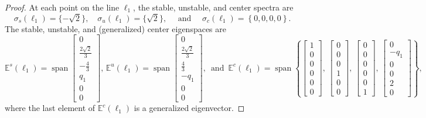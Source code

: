 \documentclass[11pt]{article}
\numberwithin{equation}{section}
\begin{document}
\begin{proof}
At each point on the line $\ell_1$,
the stable, unstable, and center spectra are 
%
\[ \sigma_s(\ell_1) = \{ -\sqrt 2 \}, \quad \sigma_u(\ell_1) = \{ \sqrt 2 \}, \quad \text{ and } \quad \sigma_c(\ell_1) = \left\{ 0,0,0,0 \right\}. \]
%
The stable, unstable, and (generalized) center eigenspaces are 
%
\[
\mathbb E^s(\ell_1) = \operatorname{span} \begin{bmatrix} 0 \\ \tfrac{2\sqrt 2}{3} \\ -\tfrac{4}{3} \\ q_1 \\ 0 \\ 0 \end{bmatrix}, \,
\mathbb E^u(\ell_1) = \operatorname{span} \begin{bmatrix} 0 \\ \tfrac{2\sqrt 2}{3} \\ \tfrac{4}{3} \\ -q_1 \\ 0 \\ 0 \end{bmatrix}, \, \text{ and } \,
\mathbb E^c(\ell_1) = \operatorname{span} \left\{ 
\begin{bmatrix} 1 \\ 0 \\ 0 \\ 0 \\ 0 \\ 0 \end{bmatrix}, \,
\begin{bmatrix} 0 \\ 0 \\ 0 \\ 1 \\ 0 \\ 0 \end{bmatrix}, \, 
\begin{bmatrix} 0 \\ 0 \\ 0 \\ 0 \\ 0 \\ 1 \end{bmatrix}, \,
\begin{bmatrix} 0 \\ -q_1 \\ 0 \\ 0 \\ 2 \\ 0 \end{bmatrix}
\right\},
\]
%
where the last element of $\mathbb E^c(\ell_1)$ is a generalized eigenvector.


\end{proof}
\end{document}
